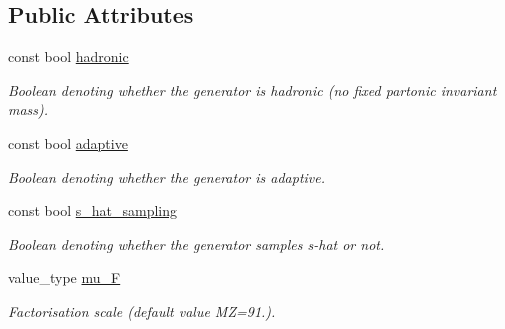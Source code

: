 \subsection*{Public Attributes}
\begin{DoxyCompactItemize}
\item 
const bool \hyperlink{a00308_afc30246f82f7c9c7cea2e355ed7b55bf}{hadronic}
\begin{DoxyCompactList}\small\item\em Boolean denoting whether the generator is hadronic (no fixed partonic invariant mass). \end{DoxyCompactList}\item 
\hypertarget{a00308_acecbc0518b41515b44388c5cbd10934d}{}const bool \hyperlink{a00308_acecbc0518b41515b44388c5cbd10934d}{adaptive}\label{a00308_acecbc0518b41515b44388c5cbd10934d}

\begin{DoxyCompactList}\small\item\em Boolean denoting whether the generator is adaptive. \end{DoxyCompactList}\item 
\hypertarget{a00308_ab98815354277395330a88d2324d1f0ec}{}const bool \hyperlink{a00308_ab98815354277395330a88d2324d1f0ec}{s\+\_\+hat\+\_\+sampling}\label{a00308_ab98815354277395330a88d2324d1f0ec}

\begin{DoxyCompactList}\small\item\em Boolean denoting whether the generator samples s-\/hat or not. \end{DoxyCompactList}\item 
\hypertarget{a00308_a57bb53eb0519734bc80f2d461abbfa0e}{}value\+\_\+type \hyperlink{a00308_a57bb53eb0519734bc80f2d461abbfa0e}{mu\+\_\+\+F}\label{a00308_a57bb53eb0519734bc80f2d461abbfa0e}

\begin{DoxyCompactList}\small\item\em Factorisation scale (default value M\+Z=91.). \end{DoxyCompactList}\end{DoxyCompactItemize}
